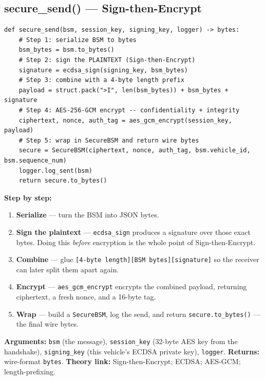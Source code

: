 \documentclass[11pt,a4paper]{article}
\begin{document}
\subsection{secure\_send() --- Sign-then-Encrypt}
\begin{lstlisting}[style=py,caption={v2v\_protocol.py --- secure\_send: the sending pipeline.}]
def secure_send(bsm, session_key, signing_key, logger) -> bytes:
    # Step 1: serialize BSM to bytes
    bsm_bytes = bsm.to_bytes()
    # Step 2: sign the PLAINTEXT (Sign-then-Encrypt)
    signature = ecdsa_sign(signing_key, bsm_bytes)
    # Step 3: combine with a 4-byte length prefix
    payload = struct.pack(">I", len(bsm_bytes)) + bsm_bytes + signature
    # Step 4: AES-256-GCM encrypt -- confidentiality + integrity
    ciphertext, nonce, auth_tag = aes_gcm_encrypt(session_key, payload)
    # Step 5: wrap in SecureBSM and return wire bytes
    secure = SecureBSM(ciphertext, nonce, auth_tag, bsm.vehicle_id, bsm.sequence_num)
    logger.log_sent(bsm)
    return secure.to_bytes()
\end{lstlisting}
\textbf{Step by step:}
\begin{enumerate}
  \item \textbf{Serialize} --- turn the BSM into JSON bytes.
  \item \textbf{Sign the plaintext} --- \texttt{ecdsa\_sign} produces a signature
        over those exact bytes. Doing this \emph{before} encryption is the whole
        point of Sign-then-Encrypt.
  \item \textbf{Combine} --- glue \texttt{[4-byte length][BSM bytes][signature]}
        so the receiver can later split them apart again.
  \item \textbf{Encrypt} --- \texttt{aes\_gcm\_encrypt} encrypts the combined
        payload, returning ciphertext, a fresh nonce, and a 16-byte tag.
  \item \textbf{Wrap} --- build a \texttt{SecureBSM}, log the send, and return
        \texttt{secure.to\_bytes()} --- the final wire bytes.
\end{enumerate}
\textbf{Arguments:} \texttt{bsm} (the message), \texttt{session\_key} (32-byte
AES key from the handshake), \texttt{signing\_key} (this vehicle's ECDSA private
key), \texttt{logger}. \textbf{Returns:} wire-format \texttt{bytes}.
\textbf{Theory link:} Sign-then-Encrypt; ECDSA; AES-GCM; length-prefixing.
\end{document}
